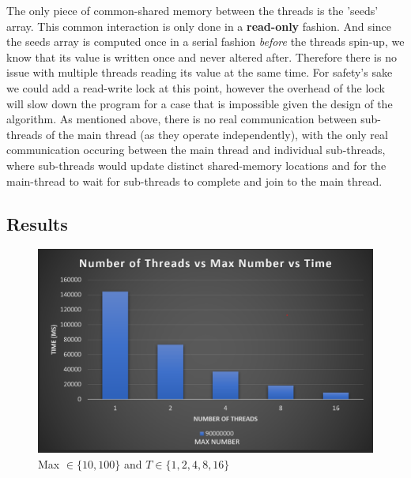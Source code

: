The only piece of common-shared memory between the threads is the 'seeds' array. 
This common interaction is only done in a \textbf{read-only} fashion. And since the 
seeds array is computed once in a serial fashion \textit{before} the threads spin-up, 
we know that its value is written once and never altered after. Therefore there 
is no issue with multiple threads reading its value at the same time. 
For safety's sake we could add a read-write lock at this point, however the 
overhead of the lock will slow down the program for a case that is impossible 
given the design of the algorithm. As mentioned above, there is no real communication between sub-threads of the 
main thread (as they operate independently), with the only real communication 
occuring between the main thread and individual sub-threads, where sub-threads 
would update distinct shared-memory locations and for the main-thread to wait 
for sub-threads to complete and join to the main thread.

\subsection{Results}

\begin{figure}
    \centering
    \includegraphics[width=\linewidth]{Figures/maxNumVHigh.png}
    \caption{Max $\in \{10, 100\}$ and $T \in \{1, 2, 4, 8, 16\}$}
    \label{fig:maxnumvhigh}
\end{figure}

